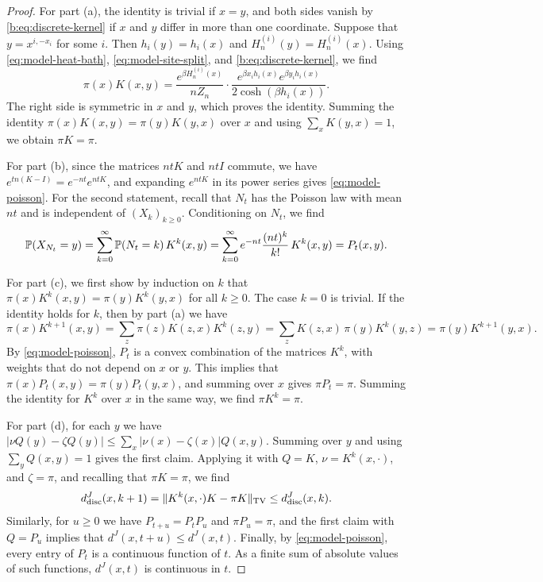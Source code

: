 \begin{proof}
For part (a), the identity is trivial if $x=y$, and both sides vanish by \eqref{b:eq:discrete-kernel} if $x$ and $y$ differ in more than one coordinate. Suppose that $y=x^{i,-x_i}$ for some $i$. Then $h_i(y)=h_i(x)$ and $H_n^{(i)}(y)=H_n^{(i)}(x)$. Using \eqref{eq:model-heat-bath}, \eqref{eq:model-site-split}, and \eqref{b:eq:discrete-kernel}, we find
\[
 \pi(x)K(x,y)=\frac{e^{\beta H_n^{(i)}(x)}}{nZ_n}\cdot\frac{e^{\beta x_ih_i(x)}e^{\beta y_ih_i(x)}}{2\cosh(\beta h_i(x))}.
\]
The right side is symmetric in $x$ and $y$, which proves the identity. Summing the identity $\pi(x)K(x,y)=\pi(y)K(y,x)$ over $x$ and using $\sum_xK(y,x)=1$, we obtain $\pi K=\pi$.

For part (b), since the matrices $ntK$ and $ntI$ commute, we have $e^{tn(K-I)}=e^{-nt}e^{ntK}$, and expanding $e^{ntK}$ in its power series gives \eqref{eq:model-poisson}. For the second statement, recall that $N_t$ has the Poisson law with mean $nt$ and is independent of $(X_k)_{k\ge0}$. Conditioning on $N_t$, we find
\[
 \mathbb P(X_{N_t}=y)=\sum_{k=0}^\infty\mathbb P(N_t=k)\,K^k(x,y)=\sum_{k=0}^\infty e^{-nt}\frac{(nt)^k}{k!}\,K^k(x,y)=P_t(x,y).
\]

For part (c), we first show by induction on $k$ that $\pi(x)K^k(x,y)=\pi(y)K^k(y,x)$ for all $k\ge0$. The case $k=0$ is trivial. If the identity holds for $k$, then by part (a) we have
\[
 \pi(x)K^{k+1}(x,y)=\sum_z\pi(z)K(z,x)K^k(z,y)=\sum_zK(z,x)\,\pi(y)K^k(y,z)=\pi(y)K^{k+1}(y,x).
\]
By \eqref{eq:model-poisson}, $P_t$ is a convex combination of the matrices $K^k$, with weights that do not depend on $x$ or $y$. This implies that $\pi(x)P_t(x,y)=\pi(y)P_t(y,x)$, and summing over $x$ gives $\pi P_t=\pi$. Summing the identity for $K^k$ over $x$ in the same way, we find $\pi K^k=\pi$.

For part (d), for each $y$ we have $|\nu Q(y)-\zeta Q(y)|\le\sum_x|\nu(x)-\zeta(x)|Q(x,y)$. Summing over $y$ and using $\sum_yQ(x,y)=1$ gives the first claim. Applying it with $Q=K$, $\nu=K^k(x,\cdot)$, and $\zeta=\pi$, and recalling that $\pi K=\pi$, we find
\[
 d^J_{\rm disc}(x,k+1)=\lVert K^k(x,\cdot)K-\pi K\rVert_{\mathrm{TV}}\le d^J_{\rm disc}(x,k).
\]
Similarly, for $u\ge0$ we have $P_{t+u}=P_tP_u$ and $\pi P_u=\pi$, and the first claim with $Q=P_u$ implies that $d^J(x,t+u)\le d^J(x,t)$. Finally, by \eqref{eq:model-poisson}, every entry of $P_t$ is a continuous function of $t$. As a finite sum of absolute values of such functions, $d^J(x,t)$ is continuous in $t$.
\end{proof}

